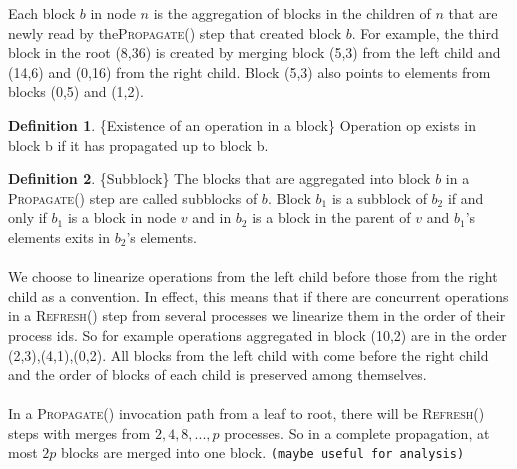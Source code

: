 \documentclass[10pt]{article}
\newtheorem{lemma}[theorem]{Lemma}
\theoremstyle{definition}
\newtheorem{definition}{Definition}
\begin{document}
Each block $b$ in node $n$ is the aggregation of blocks in the  children of $n$ that are newly read by the\textsc{Propagate}() step that created block $b$. For example, the third block in the root (8,36) is created by merging block (5,3) from the left child and (14,6) and (0,16) from the right child. Block (5,3) also points to elements from blocks (0,5) and (1,2). 

\begin{definition}\{Existence of an operation in a block\}  Operation op exists in block b if it has propagated up to block b.
\end{definition}


\begin{definition}\{Subblock\}
  The blocks that are aggregated into block $b$ in a \textsc{Propagate}() step are called subblocks of $b$. Block $b_1$ is a subblock of $b_2$ if and only if $b_1$ is a block in node $v$ and in $b_2$ is a block in the parent of $v$ and $b_1$'s elements exits in $b_2$'s elements.
\end{definition}

\paragraph{}
We choose to linearize operations from the left child before those from the right child as a convention. In effect, this means that if there are concurrent operations in a \textsc{Refresh}() step from several processes we linearize them in the order of their process ids. So for example  operations aggregated in block (10,2) are in the order (2,3),(4,1),(0,2). All blocks from the left child with come before the right child and the order of blocks of each child is preserved among themselves.

\paragraph{}
In a \textsc{Propagate}() invocation path from a leaf to root, there will be \textsc{Refresh}() steps with merges from $2, 4, 8, ..., p$ processes. So in a complete propagation, at most $2p$ blocks are merged into one block. \texttt{(maybe useful for analysis)}
\end{document}
